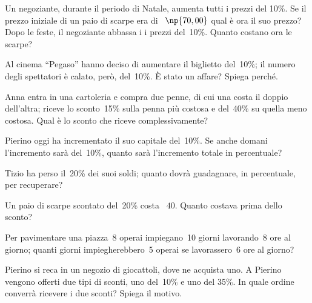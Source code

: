 \begin{multicols}{2}
\begin{esercizio}[\Ast]
Un negoziante, durante il periodo di Natale, aumenta tutti i prezzi del
10\%. Se il prezzo iniziale di un paio di scarpe era di \officialeuro~$\np{70,00}$
qual è ora il suo prezzo? Dopo le feste, il negoziante abbassa i
i prezzi del~10\%. Quanto costano ora le
scarpe?
\end{esercizio}

\begin{esercizio}[\Ast]
Al cinema ``Pegaso'' hanno deciso di aumentare il biglietto del~10\%; il numero degli spettatori
è calato, però, del~10\%. È stato un affare? Spiega perché.
\end{esercizio}

\begin{esercizio}
 Anna entra in una cartoleria e compra due penne, di cui una costa il
doppio dell'altra; riceve lo sconto~15\% sulla penna
più costosa e del~40\% su quella meno costosa. Qual è lo sconto che
riceve complessivamente?
\end{esercizio}

\begin{esercizio}[\Ast]
Pierino oggi ha incrementato il suo capitale del~10\%. Se anche
domani l'incremento sarà del~10\%, quanto sarà
l'incremento totale in percentuale?
\end{esercizio}

\begin{esercizio}
Tizio ha perso il~20\% dei suoi soldi; quanto dovrà guadagnare, in
percentuale, per recuperare?
\end{esercizio}

\begin{esercizio}[\Ast]
Un paio di scarpe scontato del~20\% costa \officialeuro~$40$. Quanto
costava prima dello sconto?
\end{esercizio}

\begin{esercizio}
Per pavimentare una piazza~8 operai impiegano~10 giorni
lavorando~8 ore al giorno; quanti giorni impiegherebbero~5 operai se
lavorassero~6 ore al giorno?
\end{esercizio}

\begin{esercizio}
Pierino si reca in un negozio di giocattoli, dove ne acquista uno. A
Pierino vengono offerti due tipi di sconti, uno del~10\% e uno del
35\%. In quale ordine converrà ricevere i due sconti? Spiega il
motivo.
\end{esercizio}


\end{multicols}
